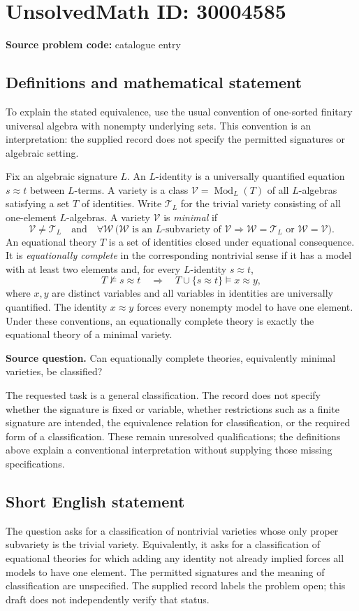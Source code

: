 \documentclass[11pt]{article}
\begin{document}
\section*{UnsolvedMath ID: 30004585}
\textbf{Source problem code:} catalogue entry
\subsection{Definitions and mathematical statement}
To explain the stated equivalence, use the usual convention of one-sorted finitary universal algebra with nonempty underlying sets. This convention is an interpretation: the supplied record does not specify the permitted signatures or algebraic setting.

Fix an algebraic signature \(L\). An \(L\)-identity is a universally quantified equation \(s\approx t\) between \(L\)-terms. A variety is a class \(\mathcal V=\operatorname{Mod}_L(T)\) of all \(L\)-algebras satisfying a set \(T\) of identities. Write \(\mathcal T_L\) for the trivial variety consisting of all one-element \(L\)-algebras. A variety \(\mathcal V\) is \emph{minimal} if
\[
\mathcal V\ne\mathcal T_L
\quad\text{and}\quad
\forall\mathcal W\,
\bigl(\mathcal W\text{ is an }L\text{-subvariety of }\mathcal V
\Longrightarrow
\mathcal W=\mathcal T_L\text{ or }\mathcal W=\mathcal V\bigr).
\]
An equational theory \(T\) is a set of identities closed under equational consequence. It is \emph{equationally complete} in the corresponding nontrivial sense if it has a model with at least two elements and, for every \(L\)-identity \(s\approx t\),
\[
T\not\models s\approx t
\quad\Longrightarrow\quad
T\cup\{s\approx t\}\models x\approx y,
\]
where \(x,y\) are distinct variables and all variables in identities are universally quantified. The identity \(x\approx y\) forces every nonempty model to have one element. Under these conventions, an equationally complete theory is exactly the equational theory of a minimal variety.

\textbf{Source question.} Can equationally complete theories, equivalently minimal varieties, be classified?

The requested task is a general classification. The record does not specify whether the signature is fixed or variable, whether restrictions such as a finite signature are intended, the equivalence relation for classification, or the required form of a classification. These remain unresolved qualifications; the definitions above explain a conventional interpretation without supplying those missing specifications.
\subsection{Short English statement}
The question asks for a classification of nontrivial varieties whose only proper subvariety is the trivial variety. Equivalently, it asks for a classification of equational theories for which adding any identity not already implied forces all models to have one element. The permitted signatures and the meaning of classification are unspecified. The supplied record labels the problem open; this draft does not independently verify that status.
\end{document}
